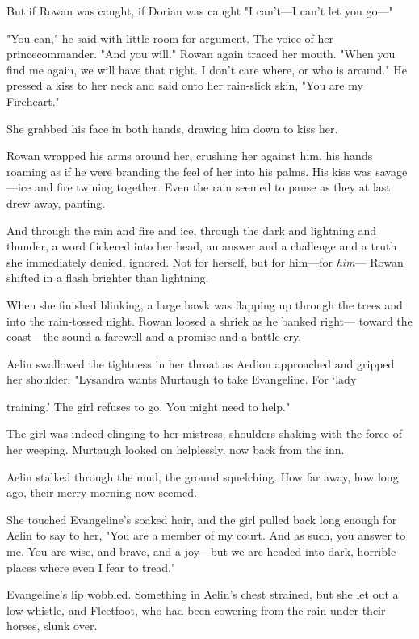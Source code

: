 But if Rowan was caught, if Dorian was caught  "I can't---I can't let you go---"

"You can," he said with little room for argument. The voice of her princecommander. "And you will." Rowan again traced her mouth. "When you find me again, we will have that night. I don't care where, or who is around." He pressed a kiss to her neck and said onto her rain-slick skin, "You are my Fireheart."

She grabbed his face in both hands, drawing him down to kiss her.

Rowan wrapped his arms around her, crushing her against him, his hands roaming as if he were branding the feel of her into his palms. His kiss was savage---ice and fire twining together. Even the rain seemed to pause as they at last drew away, panting.

And through the rain and fire and ice, through the dark and lightning and thunder, a word flickered into her head, an answer and a challenge and a truth she immediately denied, ignored. Not for herself, but for him---for \emph{him}--- Rowan shifted in a flash brighter than lightning.

When she finished blinking, a large hawk was flapping up through the trees and into the rain-tossed night. Rowan loosed a shriek as he banked right--- toward the coast---the sound a farewell and a promise and a battle cry.

Aelin swallowed the tightness in her throat as Aedion approached and gripped her shoulder. "Lysandra wants Murtaugh to take Evangeline. For
`lady

training.' The girl refuses to go. You might need to  help."

The girl was indeed clinging to her mistress, shoulders shaking with the force of her weeping. Murtaugh looked on helplessly, now back from the inn.

Aelin stalked through the mud, the ground squelching. How far away, how long ago, their merry morning now seemed.

She touched Evangeline's soaked hair, and the girl pulled back long enough for Aelin to say to her, "You are a member of my court. And as such, you answer to me. You are wise, and brave, and a joy---but we are headed into dark, horrible places where even I fear to tread."

Evangeline's lip wobbled. Something in Aelin's chest strained, but she let out a low whistle, and Fleetfoot, who had been cowering from the rain under their horses, slunk over.

